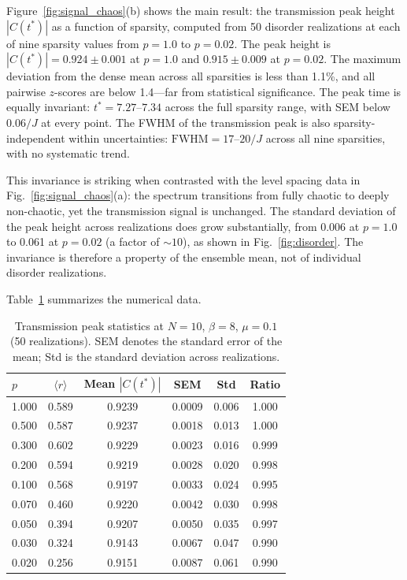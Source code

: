 \documentclass[aps,prd,twocolumn,superscriptaddress,nofootinbib,floatfix]{revtex4-2}
\newcommand{\avg}[1]{\langle #1 \rangle}
\begin{document}
Figure~\ref{fig:signal_chaos}(b) shows the main result: the
transmission peak height $|C(t^*)|$ as a function of sparsity, computed
from 50 disorder realizations at each of nine sparsity values from
$p=1.0$ to $p=0.02$. The peak height is $|C(t^*)| = 0.924 \pm 0.001$
at $p=1.0$ and $0.915 \pm 0.009$ at $p=0.02$. The maximum deviation
from the dense mean across all sparsities is less than 1.1\%, and all
pairwise $z$-scores are below 1.4---far from statistical significance.
The peak time is equally invariant: $t^* = 7.27$--$7.34$ across the
full sparsity range, with SEM below $0.06/J$ at every point. The FWHM
of the transmission peak is also sparsity-independent within
uncertainties: $\mathrm{FWHM} = 17$--$20/J$ across all nine sparsities,
with no systematic trend.

This invariance is striking when contrasted with the level spacing data
in Fig.~\ref{fig:signal_chaos}(a): the spectrum transitions from fully
chaotic to deeply non-chaotic, yet the transmission signal is unchanged.
The standard deviation of the peak height across realizations does grow
substantially, from 0.006 at $p=1.0$ to 0.061 at $p=0.02$ (a factor
of ${\sim}10$), as shown in Fig.~\ref{fig:disorder}. The invariance
is therefore a property of the ensemble mean, not of individual disorder
realizations.

Table~\ref{tab:transmission} summarizes the numerical data.

\begin{table}[b]
\caption{Transmission peak statistics at $N=10$, $\beta=8$, $\mu=0.1$
(50 realizations). SEM denotes the standard error of the mean; Std is
the standard deviation across realizations.}
\label{tab:transmission}
\begin{ruledtabular}
\begin{tabular}{lccccc}
$p$ & $\avg{r}$ & Mean $|C(t^*)|$ & SEM & Std & Ratio \\
\hline
1.000 & 0.589 & 0.9239 & 0.0009 & 0.006 & 1.000 \\
0.500 & 0.587 & 0.9237 & 0.0018 & 0.013 & 1.000 \\
0.300 & 0.602 & 0.9229 & 0.0023 & 0.016 & 0.999 \\
0.200 & 0.594 & 0.9219 & 0.0028 & 0.020 & 0.998 \\
0.100 & 0.568 & 0.9197 & 0.0033 & 0.024 & 0.995 \\
0.070 & 0.460 & 0.9220 & 0.0042 & 0.030 & 0.998 \\
0.050 & 0.394 & 0.9207 & 0.0050 & 0.035 & 0.997 \\
0.030 & 0.324 & 0.9143 & 0.0067 & 0.047 & 0.990 \\
0.020 & 0.256 & 0.9151 & 0.0087 & 0.061 & 0.990 \\
\end{tabular}
\end{ruledtabular}
\end{table}
\end{document}
